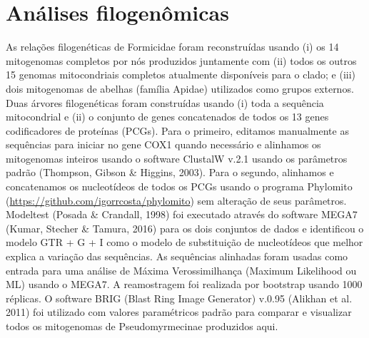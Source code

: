 \documentclass[../DISSERTACAO_MAIN.tex]{subfiles}
\begin{document}
\section{Análises filogenômicas}

	As relações filogenéticas de Formicidae foram reconstruídas usando (i) os 14 mitogenomas completos por nós produzidos juntamente com (ii) todos os outros 15 genomas mitocondriais completos atualmente disponíveis para o clado; e (iii) dois mitogenomas de abelhas (família Apidae) utilizados como grupos externos. Duas árvores filogenéticas foram construídas usando (i) toda a sequência mitocondrial e (ii) o conjunto de genes concatenados de todos os 13 genes codificadores de proteínas (PCGs). Para o primeiro, editamos manualmente as sequências para iniciar no gene COX1 quando necessário e alinhamos os mitogenomas inteiros usando o software ClustalW v.2.1 usando os parâmetros padrão (Thompson, Gibson \& Higgins, 2003). Para o segundo, alinhamos e concatenamos os nucleotídeos de todos os PCGs usando o programa Phylomito (\url{https://github.com/igorrcosta/phylomito}) sem alteração de seus parâmetros. Modeltest (Posada \& Crandall, 1998) foi executado através do software MEGA7 (Kumar, Stecher \& Tamura, 2016) para os dois conjuntos de dados e identificou o modelo GTR + G + I como o modelo de substituição de nucleotídeos que melhor explica a variação das sequências. As sequências alinhadas foram usadas como entrada para uma análise de Máxima Verossimilhança (Maximum Likelihood ou ML) usando o MEGA7. A reamostragem foi realizada por bootstrap usando 1000 réplicas. O software BRIG (Blast Ring Image Generator) v.0.95 (Alikhan et al. 2011) foi utilizado com valores paramétricos padrão para comparar e visualizar todos os mitogenomas de Pseudomyrmecinae produzidos aqui.
\end{document}
